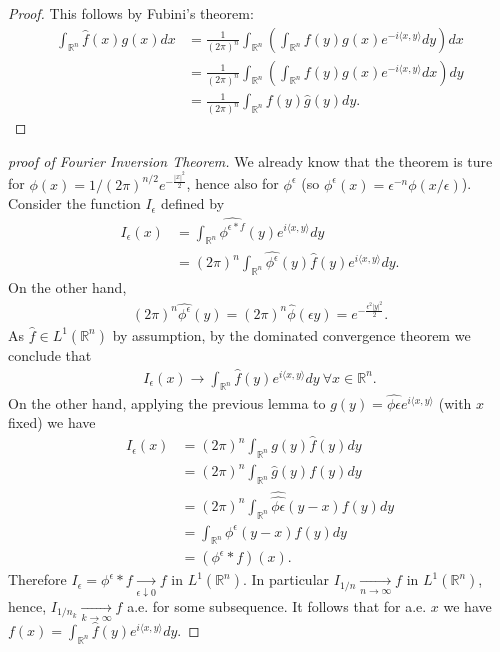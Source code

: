 \ifdetailed 
\begin{proof}
    This follows by Fubini's theorem:
    \begin{align*}
        \int_{\mathbb{R}^n} \hat{f}(x)g(x) dx &= \frac{1}{(2\pi)^n}\int_{\mathbb{R}^n}\left(\int_{\mathbb{R}^n}f(y)g(x)e^{-i\langle x,y\rangle}dy\right) dx \\
        &=\frac{1}{(2\pi)^n}\int_{\mathbb{R}^n}\left(\int_{\mathbb{R}^n}f(y)g(x)e^{-i\langle x,y\rangle}dx\right) dy \\
        &= \frac{1}{(2\pi)^n}\int_{\mathbb{R}^n}f(y)\hat{g}(y)dy.
    \end{align*}
\end{proof}
\begin{proof}[proof of Fourier Inversion Theorem]
    We already know that the theorem is ture for \(\phi(x) = 1/(2\pi)^{n/2}e^{-\frac{|x|^2}{2}}\), hence also for \(\phi^{\epsilon}\) (so \(\phi^{\epsilon}(x) = \epsilon^{-n}\phi(x/\epsilon)\)). Consider the function \(I_{\epsilon}\) defined by 
    \begin{align*}
        I_{\epsilon}(x) &= \int_{\mathbb{R}^n} \widehat{\phi^{\epsilon\ast f}}(y)e^{i\langle x,y\rangle}dy \\
        &= (2\pi)^n\int_{\mathbb{R}^n} \widehat{\phi^{\epsilon}} (y) \hat{f}(y) e^{i\langle x,y \rangle}dy.
    \end{align*}
    On the other hand, 
    \begin{align*}
        (2\pi)^n\widehat{\phi^{\epsilon}}(y) = (2\pi)^n\hat{\phi}(\epsilon y) = e^{-\frac{\epsilon^2|y|^2}{2}}.
    \end{align*}
    As \(\hat{f}\in L^1(\mathbb{R}^n)\) by assumption, by the dominated convergence theorem we conclude that 
    \begin{align*}
        I_{\epsilon}(x) \rightarrow \int_{\mathbb{R}^n} \hat{f}(y)e^{i\langle x,y\rangle}dy \ \forall x\in\mathbb{R}^n.
    \end{align*}
    On the other hand, applying the previous lemma to \(g(y) = \widehat{\phi\epsilon} e^{i\langle x,y\rangle}\) (with \(x\) fixed) we have 
    \begin{align*}
        I_{\epsilon}(x) &= (2\pi)^n\int_{\mathbb{R}^n} g(y)\hat{f}(y)dy \\
        &= (2\pi)^n\int_{\mathbb{R}^n} \hat{g}(y)f(y)dy \\
        &= (2\pi)^n \int_{\mathbb{R}^n} \widehat{\widehat{\phi\epsilon}}(y-x)f(y)dy \\
        &= \int_{\mathbb{R}^n} \phi^{\epsilon}(y-x)f(y)dy \\
        &= (\phi^{\epsilon}\ast f)(x).
    \end{align*}
    Therefore \(I_{\epsilon} = \phi^{\epsilon}\ast f\xrightarrow[\epsilon\downarrow 0]{ }f\) in \(L^1(\mathbb{R}^n)\). In particular \(I_{1/n}\xrightarrow[n\rightarrow\infty]{ }f\) in \(L^1(\mathbb{R}^n)\), hence, \(I_{1/n_k}\xrightarrow[k\rightarrow\infty]{ }f\) a.e. for some subsequence. It follows that for a.e. \(x\) we have \(f(x) = \int_{\mathbb{R}^n} \hat{f}(y)e^{i\langle x,y\rangle}dy\). 
\end{proof}

